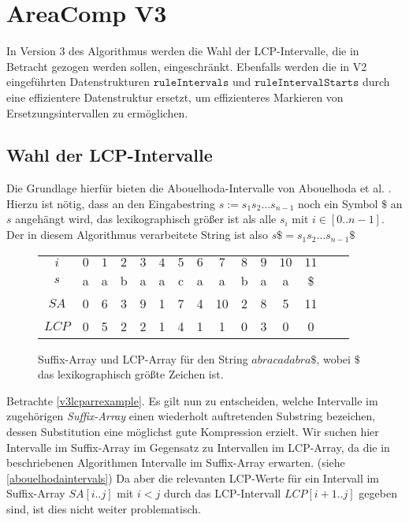 \section{AreaComp V3}

In Version 3 des Algorithmus werden die Wahl der LCP-Intervalle, die in Betracht gezogen werden sollen, eingeschränkt. Ebenfalls werden die in V2 eingeführten Datenstrukturen $\texttt{ruleIntervals}$ und $\texttt{ruleIntervalStarts}$ durch eine effizientere Datenstruktur ersetzt, um effizienteres Markieren von Ersetzungsintervallen zu ermöglichen. 

\subsection{Wahl der LCP-Intervalle}
\label{lcpchoice}

Die Grundlage hierfür bieten die Abouelhoda-Intervalle von Abouelhoda et al. \cite{abouelhoda_optimal_2002}.
Hierzu ist nötig, dass an den Eingabestring $s := s_1s_2\dots s_{n-1}$ noch ein Symbol $\$$ an $s$ angehängt wird, das lexikographisch größer ist als alle $s_i$ mit $i \in [0..n-1]$. Der in diesem Algorithmus verarbeitete String ist also $s\$ = s_1s_2\dots s_{n-1}\$$
\begin{figure}
	\centering
    \begin{tabular}{c|c|c|c|c|c|c|c|c|c|c|c|c|c|c|}
        \multicolumn{1}{c}{$i$} & \multicolumn{1}{c}{$0$} & \multicolumn{1}{c}{$1$} & \multicolumn{1}{c}{$2$} & \multicolumn{1}{c}{$3$} & \multicolumn{1}{c}{$4$} & \multicolumn{1}{c}{$5$} & \multicolumn{1}{c}{$6$} & \multicolumn{1}{c}{$7$} & \multicolumn{1}{c}{$8$} & \multicolumn{1}{c}{$9$} & \multicolumn{1}{c}{$10$} & \multicolumn{1}{c}{$11$}\\\cline{2-13}
        $s$   & a & a & b & a & a & c & a & a & b & a & a & \$\\\cline{2-13}
        $SA$  & 0 & 6 & 3 & 9 & 1 & 7 & 4 & 10 & 2 & 8 & 5 & 11\\\cline{2-13}
        $LCP$ & 0 & 5 & 2 & 2 & 1 & 4 & 1 & 1 & 0 & 3 & 0 & 0\\\cline{2-13}
    \end{tabular}
    \caption{Suffix-Array und LCP-Array für den String $abracadabra\$$, wobei $\$$ das lexikographisch größte Zeichen ist.}
    \label{v3lcparrexample}
\end{figure}

Betrachte \autoref{v3lcparrexample}.
Es gilt nun zu entscheiden, welche Intervalle im zugehörigen \emph{Suffix-Array} einen wiederholt auftretenden Substring bezeichen, dessen Substitution eine möglichst gute Kompression erzielt.
Wir suchen hier Intervalle im Suffix-Array im Gegensatz zu Intervallen im LCP-Array, da die in \cite{abouelhoda_optimal_2002} beschriebenen Algorithmen Intervalle im Suffix-Array erwarten. (siehe \autoref{abouelhodaintervals})
Da aber die relevanten LCP-Werte für ein Intervall im Suffix-Array $SA[i..j]$ mit $i < j$ durch das LCP-Intervall $LCP[i+1..j]$ gegeben sind, ist dies nicht weiter problematisch. 

